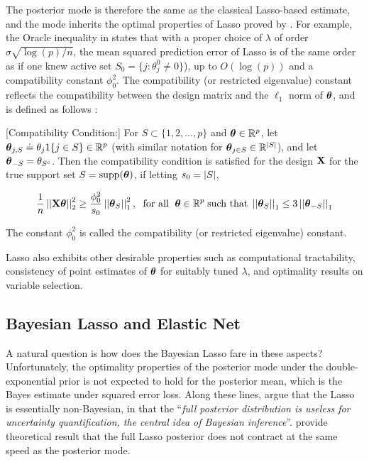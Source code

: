 \documentclass[sts,preprint]{imsart}
\begin{document}
The posterior mode is therefore	the	 same as the classical Lasso-based estimate, and the mode inherits the optimal properties of Lasso proved by \cite{buhlmann2011statistics}. For example, the Oracle inequality in \citet[Eq. (2.8), Th. (6.1)]{buhlmann2011statistics} states that with a proper choice of $\lambda$ of order $\sigma \sqrt{\log(p)/n}$, the mean squared prediction error of Lasso is of the same order as if one knew active set $S_0 = \{j : \theta_j^0 \neq 0 \}$), up to $O(\log(p))$ and a compatibility constant $\phi_0^2$. The compatibility (or restricted eigenvalue) constant reflects the compatibility between the design matrix and the $\ell_1$ norm of $\boldsymbol{\theta}$, and is defined as follows \citep[Eq (6.4)]{buhlmann2011statistics}:


\begin{definition}\label{def:compatibility}[Compatibility Condition:] 
For $S \subset \{1,2,\ldots,p\}$ and $\boldsymbol{\theta} \in \mathbb{R}^{p}$, let $\boldsymbol{\theta}_{j,S} \doteq \theta_j 1\{j \in S\} \in \mathbb{R}^{p}$ (with similar notation for $\boldsymbol{\theta}_{j \in S} \in \mathbb{R}^{\lvert S\rvert}$), and let $\boldsymbol{\theta}_{-S} = \theta_{S^c}$. Then the compatibility condition is satisfied for the design ${\bf X}$ for the true support set $S = \text{supp}(\boldsymbol{\theta})$, if letting $s_0 = \lvert S\rvert$,

$$
\frac{1}{n} \left|\left|{\bf X}\boldsymbol{\theta}\right|\right|_2^2 \ge \frac{\phi_0^2}{s_0} \left|\left|\boldsymbol{\theta}_{S}\right|\right|_1^2, \; \text{ for all } \; \boldsymbol{\theta} \in \mathbb{R}^p \; \text{such that} \; \left|\left|\boldsymbol{\theta}_S\right|\right|_1 \le 3 \left|\left|\boldsymbol{\theta}_{-S}\right|\right|_1
$$

The constant $\phi_0^2$ is called the compatibility (or restricted eigenvalue) constant.
\end{definition}

Lasso also exhibits other desirable properties such as computational
tractability, consistency of point estimates of $\boldsymbol{\theta}$ for suitably tuned
$\lambda$, and optimality results on variable selection. 


\subsection{Bayesian Lasso and Elastic Net}

A natural question is how does the Bayesian Lasso fare in these aspects? Unfortunately, the optimality properties of the posterior mode under the double-exponential prior is not expected to hold for the posterior mean, which is the Bayes estimate under squared error loss. Along these lines, \citet{castillo2015bayesian} argue that the Lasso is essentially non-Bayesian, in that the ``\textsl{full posterior distribution is useless for uncertainty quantification, the central idea of Bayesian inference}''. \citet{castillo2015bayesian} provide theoretical result that the full Lasso posterior does not contract at the same speed as the posterior mode. 
\end{document}
